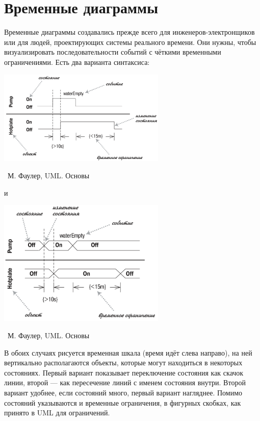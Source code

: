 \documentclass[a5paper]{article}
\newcommand{\attribution}[1] {
	\vspace{-5mm}\begin{flushright}\begin{scriptsize}%
	{\textcopyright\, #1}\end{scriptsize}\end{flushright}
}
\begin{document}
\section{Временные диаграммы}

Временные диаграммы создавались прежде всего для инженеров-электронщиков или для людей, проектирующих системы реального времени. Они нужны, чтобы визуализировать последовательности событий с чёткими временными ограничениями. Есть два варианта синтаксиса:

\begin{center}
	\includegraphics[width=0.6\textwidth]{timingDiagrams.png}
	\attribution{М. Фаулер, UML. Основы}
\end{center}

и

\begin{center}
	\includegraphics[width=0.6\textwidth]{timingDiagramsAlternate.png}
	\attribution{М. Фаулер, UML. Основы}
\end{center}

В обоих случаях рисуется временная шкала (время идёт слева направо), на ней вертикально располагаются объекты, которые могут находиться в некоторых состояниях. Первый вариант показывает переключение состояния как скачок линии, второй --- как пересечение линий с именем состояния внутри. Второй вариант удобнее, если состояний много, первый вариант нагляднее. Помимо состояний указываются и временные ограничения, в фигурных скобках, как принято в UML для ограничений.
\end{document}
